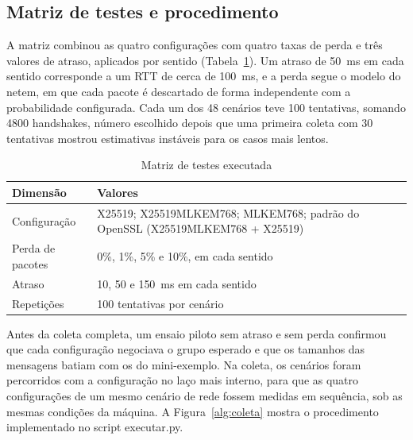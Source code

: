 \documentclass[12pt,a4paper]{article}
\newcommand{\fonte}[1]{\par\vspace{4pt}{\small Fonte: #1}}
\begin{document}
\subsection{Matriz de testes e procedimento}
\label{subsec:matriz}

A matriz combinou as quatro configurações com quatro taxas de perda e três
valores de atraso, aplicados por sentido (Tabela~\ref{tab:matriz-experimento}).
Um atraso de 50~ms em cada sentido corresponde a um RTT de cerca de
100~ms, e a perda segue o modelo do netem, em que cada pacote é descartado
de forma independente com a probabilidade configurada. Cada um dos 48 cenários teve 100 tentativas, somando 4800 handshakes,
número escolhido depois que uma primeira coleta com 30 tentativas mostrou
estimativas instáveis para os casos mais lentos.

\begin{table}[H]
\centering
\caption{Matriz de testes executada}
\label{tab:matriz-experimento}
\small
\begin{tabular}{p{4cm}p{9cm}}
\toprule
Dimensão & Valores \\
\midrule
Configuração & X25519; X25519MLKEM768; MLKEM768; padrão do OpenSSL (X25519MLKEM768 + X25519) \\
Perda de pacotes & 0\%, 1\%, 5\% e 10\%, em cada sentido \\
Atraso & 10, 50 e 150~ms em cada sentido \\
Repetições & 100 tentativas por cenário \\
\bottomrule
\end{tabular}
\fonte{Elaborado pelos autores.}
\end{table}

Antes da coleta completa, um ensaio piloto sem atraso e sem perda
confirmou que cada configuração negociava o grupo esperado e que os
tamanhos das mensagens batiam com os do mini-exemplo. Na coleta, os
cenários foram percorridos com a configuração no laço mais interno, para
que as quatro configurações de um mesmo cenário de rede fossem medidas em
sequência, sob as mesmas condições da máquina. A Figura~\ref{alg:coleta}
mostra o procedimento implementado no script executar.py.
\end{document}
